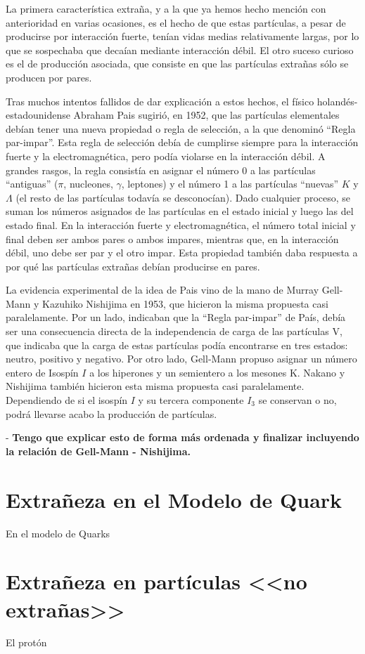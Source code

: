 La primera característica extraña, y a la que ya hemos hecho mención con anterioridad en varias ocasiones, es el hecho de que estas partículas, a pesar de producirse por interacción fuerte, tenían vidas medias relativamente largas, por lo que se sospechaba que decaían mediante interacción débil. El otro suceso curioso es el de producción asociada, que consiste en que las partículas extrañas sólo se producen por pares.  

Tras muchos intentos fallidos de dar explicación a estos hechos, el físico holandés-estadounidense Abraham Pais sugirió, en 1952, que las partículas elementales debían tener una nueva propiedad o regla de selección, a la que denominó ``Regla par-impar''. Esta regla de selección debía de cumplirse siempre para la interacción fuerte y la electromagnética, pero podía violarse en la interacción débil. A grandes rasgos, la regla consistía en asignar el número 0 a las partículas ``antiguas'' ($\pi$, nucleones, $\gamma$, leptones) y el número 1 a las partículas ``nuevas'' $K$ y $\Lambda$ (el resto de las partículas todavía se desconocían). Dado cualquier proceso, se suman los números asignados de las partículas en el estado inicial y luego las del estado final. En la interacción fuerte y electromagnética, el número total inicial y final deben ser ambos pares o ambos impares, mientras que, en la interacción débil, uno debe ser par y el otro impar. Esta propiedad también daba respuesta a por qué las partículas extrañas debían producirse en pares. \cite{Pais}

La evidencia experimental de la idea de Pais vino de la mano de Murray Gell-Mann y Kazuhiko Nishijima en 1953, que hicieron la misma propuesta casi paralelamente. Por un lado, indicaban que la ``Regla par-impar'' de País, debía ser una consecuencia directa de la independencia de carga de las partículas V, que indicaba que la carga de estas partículas podía encontrarse en tres estados: neutro, positivo y negativo. Por otro lado, Gell-Mann propuso asignar un número entero de Isospín $I$ a los hiperones y un semientero a los mesones K. Nakano y Nishijima también hicieron esta misma propuesta casi paralelamente. Dependiendo de si el isospín $I$ y su tercera componente $I_3$ se conservan o no, podrá llevarse acabo la producción de partículas. \cite{Nakano1953}

- \textbf{Tengo que explicar esto de forma más ordenada y finalizar incluyendo la relación de Gell-Mann - Nishijima.}

\section{Extrañeza en el Modelo de Quark}\label{cap:strangeness_quark_model}

En el modelo de Quarks

\section{Extrañeza en partículas <<no extrañas>>}
\label{cap:non-strange_particles}
El protón